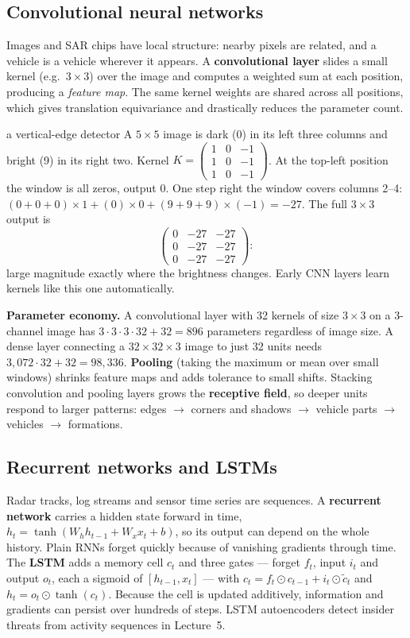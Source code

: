 \documentclass[11pt]{article}
\begin{document}
\subsection{Convolutional neural networks}
Images and SAR chips have local structure: nearby pixels are related, and a vehicle is a vehicle wherever it appears. A \textbf{convolutional layer} slides a small kernel (e.g.\ $3\times3$) over the image and computes a weighted sum at each position, producing a \emph{feature map}. The same kernel weights are shared across all positions, which gives translation equivariance and drastically reduces the parameter count.
\begin{example}{a vertical-edge detector}
A $5\times5$ image is dark (0) in its left three columns and bright (9) in its right two. Kernel $K=\begin{pmatrix}1&0&-1\\1&0&-1\\1&0&-1\end{pmatrix}$. At the top-left position the window is all zeros, output $0$. One step right the window covers columns 2--4: $(0+0+0)\times1+(0)\times0+(9+9+9)\times(-1)=-27$. The full $3\times3$ output is
\[\begin{pmatrix}0&-27&-27\\0&-27&-27\\0&-27&-27\end{pmatrix}:\]
large magnitude exactly where the brightness changes. Early CNN layers learn kernels like this one automatically.
\end{example}
\textbf{Parameter economy.} A convolutional layer with 32 kernels of size $3\times3$ on a 3-channel image has $3\cdot3\cdot3\cdot32+32=896$ parameters regardless of image size. A dense layer connecting a $32\times32\times3$ image to just 32 units needs $3{,}072\cdot32+32=98{,}336$. \textbf{Pooling} (taking the maximum or mean over small windows) shrinks feature maps and adds tolerance to small shifts. Stacking convolution and pooling layers grows the \textbf{receptive field}, so deeper units respond to larger patterns: edges $\to$ corners and shadows $\to$ vehicle parts $\to$ vehicles $\to$ formations.

\subsection{Recurrent networks and LSTMs}
Radar tracks, log streams and sensor time series are sequences. A \textbf{recurrent network} carries a hidden state forward in time, $h_t=\tanh(W_hh_{t-1}+W_xx_t+b)$, so its output can depend on the whole history. Plain RNNs forget quickly because of vanishing gradients through time. The \textbf{LSTM} adds a memory cell $c_t$ and three gates --- forget $f_t$, input $i_t$ and output $o_t$, each a sigmoid of $[h_{t-1},x_t]$ --- with $c_t=f_t\odot c_{t-1}+i_t\odot\tilde c_t$ and $h_t=o_t\odot\tanh(c_t)$. Because the cell is updated additively, information and gradients can persist over hundreds of steps. LSTM autoencoders detect insider threats from activity sequences in Lecture~5.
\end{document}
